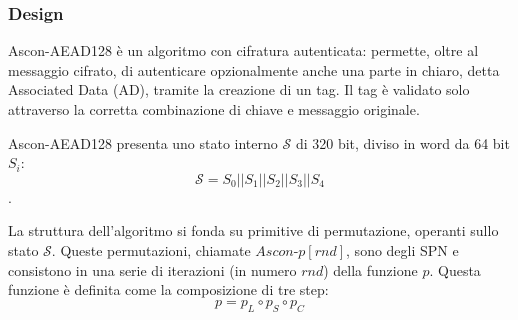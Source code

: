 \documentclass[target=bach,aauheader=,style=]{thud}
\begin{document}
			\subsubsection{Design}
			Ascon-AEAD128 è un algoritmo con cifratura autenticata: permette, oltre al messaggio cifrato, di autenticare opzionalmente anche una parte in chiaro, detta Associated Data (AD), tramite la creazione di un tag. Il tag è validato solo attraverso la corretta combinazione di chiave e messaggio originale.
			
			Ascon-AEAD128 presenta uno stato interno $\mathcal{S}$ di 320 bit, diviso in word da 64 bit $S_i$:
			\[\mathcal{S} = S_0 || S_1 || S_2 || S_3 || S_4\].
			
			La struttura dell'algoritmo si fonda su primitive di permutazione, operanti sullo stato $\mathcal{S}$. Queste permutazioni, chiamate $Ascon$-$p[rnd]$, sono degli SPN e consistono in una serie di iterazioni (in numero $rnd$) della funzione $p$. Questa funzione è definita come la composizione di tre step:
			\[p = p_L \circ p_S \circ p_C\]
\end{document}
